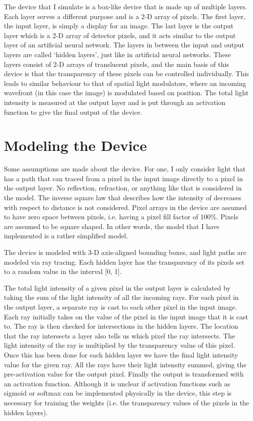 \documentclass[]{article}
\begin{document}
The device that I simulate is a box-like device that is made up of multiple layers. Each layer serves a different purpose and is a 2-D array of pixels. The first layer, the input layer, is simply a display for an image. The last layer is the output layer which is a 2-D array of detector pixels, and it acts similar to the output layer of an artificial neural network. The layers in between the input and output layers are called ‘hidden layers’, just like in artificial neural networks. These layers consist of 2-D arrays of translucent pixels, and the main basis of this device is that the transparency of these pixels can be controlled individually. This leads to similar behaviour to that of spatial light modulators, where an incoming wavefront (in this case the image) is modulated based on position. The total light intensity is measured at the output layer and is put through an activation function to give the final output of the device.

\section{Modeling the Device}
Some assumptions are made about the device. For one, I only consider light that has a path that can traced from a pixel in the input image directly to a pixel in the output layer. No reflection, refraction, or anything like that is considered in the model. The inverse square law that describes how the intensity of decreases with respect to distance is not considered. Pixel arrays in the device are assumed to have zero space between pixels, i.e. having a pixel fill factor of 100\%. Pixels are assumed to be square shaped. In other words, the model that I have implemented is a rather simplified model.

The device is modeled with 3-D axis-aligned bounding boxes, and light paths are modeled via ray tracing. Each hidden layer has the transparency of its pixels set to a random value in the interval [0, 1].

The total light intensity of a given pixel in the output layer is calculated by taking the sum of the light intensity of all the incoming rays. For each pixel in the output layer, a separate ray is cast to each other pixel in the input image. Each ray initially takes on the value of the pixel in the input image that it is cast to. The ray is then checked for intersections in the hidden layers. The location that the ray intersects a layer also tells us which pixel the ray intersects. The light intensity of the ray is multiplied by the transparency value of this pixel. Once this has been done for each hidden layer we have the final light intensity value for the given ray. All the rays have their light intensity summed, giving the pre-activation value for the output pixel. Finally the output is transformed with an activation function. Although it is unclear if activation functions such as sigmoid or softmax can be implemented physically in the device, this step is necessary for training the weights (i.e. the transparency values of the pixels in the hidden layers). 
\end{document}
